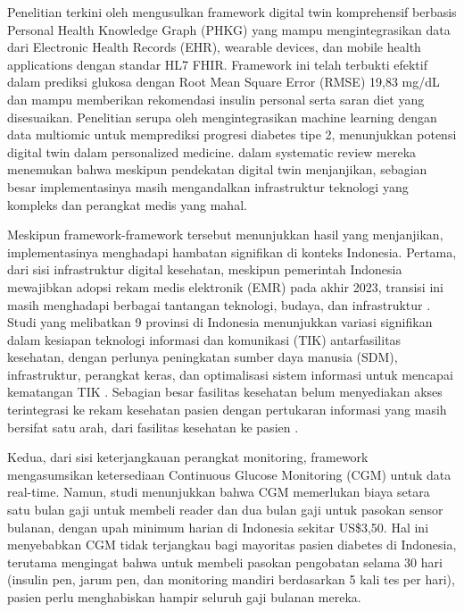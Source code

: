 \documentclass[12pt,a4paper,oneside]{book}
\begin{document}
Penelitian terkini oleh \textcite{Rad2024} mengusulkan framework digital twin komprehensif berbasis Personal Health Knowledge Graph (PHKG) yang mampu mengintegrasikan data dari Electronic Health Records (EHR), wearable devices, dan mobile health applications dengan standar HL7 FHIR. Framework ini telah terbukti efektif dalam prediksi glukosa dengan Root Mean Square Error (RMSE) 19,83 mg/dL dan mampu memberikan rekomendasi insulin personal serta saran diet yang disesuaikan. Penelitian serupa oleh \textcite{Zhang2024} mengintegrasikan machine learning dengan data multiomic untuk memprediksi progresi diabetes tipe 2, menunjukkan potensi digital twin dalam personalized medicine. \textcite{Cappon2024} dalam systematic review mereka menemukan bahwa meskipun pendekatan digital twin menjanjikan, sebagian besar implementasinya masih mengandalkan infrastruktur teknologi yang kompleks dan perangkat medis yang mahal.

Meskipun framework-framework tersebut menunjukkan hasil yang menjanjikan, implementasinya menghadapi hambatan signifikan di konteks Indonesia. Pertama, dari sisi infrastruktur digital kesehatan, meskipun pemerintah Indonesia mewajibkan adopsi rekam medis elektronik (EMR) pada akhir 2023, transisi ini masih menghadapi berbagai tantangan teknologi, budaya, dan infrastruktur \textcite{Harahap2024}. Studi yang melibatkan 9 provinsi di Indonesia menunjukkan variasi signifikan dalam kesiapan teknologi informasi dan komunikasi (TIK) antarfasilitas kesehatan, dengan perlunya peningkatan sumber daya manusia (SDM), infrastruktur, perangkat keras, dan optimalisasi sistem informasi untuk mencapai kematangan TIK \autocite{Aisyah2024}. Sebagian besar fasilitas kesehatan belum menyediakan akses terintegrasi ke rekam kesehatan pasien dengan pertukaran informasi yang masih bersifat satu arah, dari fasilitas kesehatan ke pasien \autocite{Harahap2023}.

Kedua, dari sisi keterjangkauan perangkat monitoring, framework \textcite{Rad2024} mengasumsikan ketersediaan Continuous Glucose Monitoring (CGM) untuk data real-time. Namun, studi \textcite{Ramadaniati2024} menunjukkan bahwa CGM memerlukan biaya setara satu bulan gaji untuk membeli reader dan dua bulan gaji untuk pasokan sensor bulanan, dengan upah minimum harian di Indonesia sekitar US\$3,50. Hal ini menyebabkan CGM tidak terjangkau bagi mayoritas pasien diabetes di Indonesia, terutama mengingat bahwa untuk membeli pasokan pengobatan selama 30 hari (insulin pen, jarum pen, dan monitoring mandiri berdasarkan 5 kali tes per hari), pasien perlu menghabiskan hampir seluruh gaji bulanan mereka.
\end{document}
